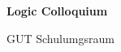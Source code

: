 \documentclass[a4paper]{article}
\begin{document}
\printGenericVSLHeader
\begin{center}
\begin{vsltext}{3cm}{4cm}

   \vspace{0.5cm} 

    \textbf{Logic Colloquium} 

    \vspace{1.5cm}

    GUT Schulumgsraum 

\end{vsltext}

\end{center}
\end{document}
